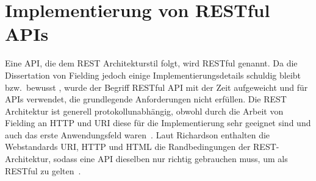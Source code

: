 \section{Implementierung von RESTful APIs}
Eine API, die dem REST Architekturstil folgt, wird RESTful genannt.
Da die Dissertation von Fielding jedoch einige Implementierungsdetails schuldig bleibt bzw.\ bewusst , wurde der Begriff RESTful API mit der Zeit aufgeweicht und für APIs verwendet, die grundlegende Anforderungen nicht erfüllen.\cite[vgl.][]{fieldBlog}
Die REST Architektur ist generell protokollunabhängig, obwohl durch die Arbeit von Fielding an HTTP und URI diese für die Implementierung sehr geeignet sind und auch das erste Anwendungsfeld waren~\cite[vgl.][109,116]{REST}.
Laut Richardson enthalten die Webstandards URI, HTTP und HTML die Randbedingungen der REST-Architektur, sodass eine API dieselben nur richtig gebrauchen muss, um als RESTful zu gelten~\cite[vgl.][]{Richardson}.
